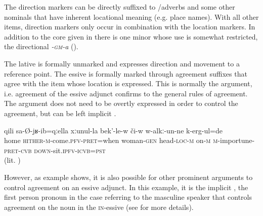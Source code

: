 The direction markers can be directly suffixed to /adverbs and some other nominals that have inherent locational meaning (e.g. place names). With all other items, direction markers only occur in combination with the location markers. In addition to the core  given in  there is one minor  whose use is somewhat restricted, the directional \textit{-\textsc{gm}-a} (). 

%
%


The lative is formally unmarked and expresses direction and movement to a reference point. The essive is formally marked through  agreement suffixes that agree with the item whose location is expressed. This is normally the  argument, i.e. agreement of the essive adjunct confirms to the general rules of  agreement. The  argument does not need to be overtly expressed in order to control the agreement, but can be left implicit . 
%
\begin{exe}
	\ex	\label{ex:when he came come, he pestered his wife}
	\gll	qili	sa-Ø-jʁ-ib=qːella	xːunul-la	bek'-le-w	či-w	w-alkː-un-ne	k-erg-ul=de\\
		home	\textsc{hither-m}-come.\textsc{pfv}-\textsc{pret}=when	woman-\textsc{gen} head-\textsc{loc}-\textsc{m} on-\textsc{m} \textsc{m-}importune-\textsc{pret}-\textsc{cvb} \textsc{down}-sit.\textsc{ipfv}-\textsc{icvb}=\textsc{pst}\\
	\glt	{} (lit. )
\end{exe} 

However, as example  shows, it is also possible for other prominent arguments to control  agreement on an essive adjunct. In this example, it is the implicit , the first person pronoun in the  case referring to the masculine speaker that controls agreement on the noun in the \textsc{in}-essive (see  for more details). 

